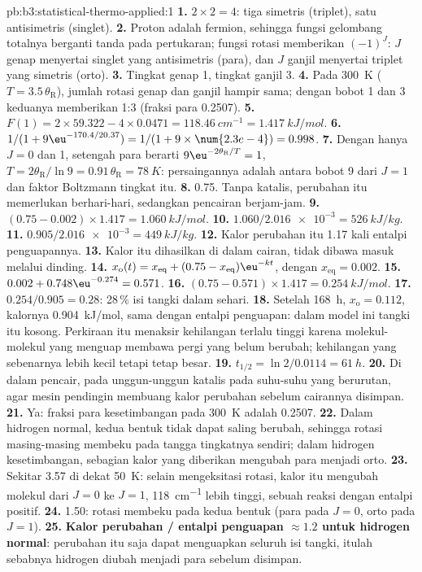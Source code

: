 \begin{solution}{pb:b3:statistical-thermo-applied:1}
\textbf{1.} $2 \times 2 = 4$: tiga simetris (triplet), satu antisimetris (singlet).
\textbf{2.} Proton adalah fermion, sehingga fungsi gelombang totalnya berganti
tanda pada pertukaran; fungsi rotasi memberikan $(-1)^J$: $J$ genap menyertai
singlet yang antisimetris (para), dan $J$ ganjil menyertai triplet yang
simetris (orto).
\textbf{3.} Tingkat genap 1, tingkat ganjil 3.
\textbf{4.} Pada \qty{300}{K} ($T = 3.5\,\theta_{\mathrm R}$), jumlah rotasi genap dan
ganjil hampir sama; dengan bobot 1 dan 3 keduanya memberikan 1:3 (fraksi para
0.2507).
\textbf{5.} $F(1) = 2 \times 59.322 - 4 \times 0.0471 = \qty{118.46}{cm^{-1}} = \qty{1.417}{kJ/mol}$.
\textbf{6.} $1/(1 + 9\eu^{-170.4/20.37}) = 1/(1 + 9 \times \num{2.3e-4}) = 0.998$.
\textbf{7.} Dengan hanya $J = 0$ dan 1, setengah para berarti
$9\eu^{-2\theta_{\mathrm R}/T} = 1$, $T = 2\theta_{\mathrm R}/\ln9 =
0.91\,\theta_{\mathrm R} = \qty{78}{K}$: persaingannya adalah antara bobot 9 dari $J = 1$
dan faktor Boltzmann tingkat itu.
\textbf{8.} 0.75. Tanpa katalis, perubahan itu memerlukan berhari-hari,
sedangkan pencairan berjam-jam.
\textbf{9.} $(0.75 - 0.002) \times 1.417 = \qty{1.060}{kJ/mol}$.
\textbf{10.} $1.060/\num{2.016e-3} = \qty{526}{kJ/kg}$.
\textbf{11.} $0.905/\num{2.016e-3} = \qty{449}{kJ/kg}$.
\textbf{12.} Kalor perubahan itu 1.17 kali entalpi penguapannya.
\textbf{13.} Kalor itu dihasilkan di dalam cairan, tidak dibawa masuk melalui
dinding.
\textbf{14.} $x_{\mathrm o}(t) = x_{\mathrm{eq}} + (0.75 - x_{\mathrm{eq}})\eu^{-kt}$, dengan
$x_{\mathrm{eq}} = 0.002$.
\textbf{15.} $0.002 + 0.748\eu^{-0.274} = 0.571$.
\textbf{16.} $(0.75 - 0.571) \times 1.417 = \qty{0.254}{kJ/mol}$.
\textbf{17.} $0.254/0.905 = 0.28$: 28\,\% isi tangki dalam sehari.
\textbf{18.} Setelah \qty{168}{h}, $x_{\mathrm o} = 0.112$, kalornya \qty{0.904}{kJ/mol},
sama dengan entalpi penguapan: dalam model ini tangki itu kosong. Perkiraan
itu menaksir kehilangan terlalu tinggi karena molekul-molekul yang menguap
membawa pergi  yang belum berubah; kehilangan yang sebenarnya
lebih kecil tetapi tetap besar.
\textbf{19.} $t_{1/2} = \ln2/0.0114 = \qty{61}{h}$.
\textbf{20.} Di dalam pencair, pada unggun-unggun katalis pada suhu-suhu yang
berurutan, agar mesin pendingin membuang kalor perubahan sebelum cairannya
disimpan.
\textbf{21.} Ya: fraksi para kesetimbangan pada \qty{300}{K} adalah 0.2507.
\textbf{22.} Dalam hidrogen normal, kedua bentuk tidak dapat saling berubah,
sehingga rotasi masing-masing membeku pada tangga tingkatnya sendiri; dalam
hidrogen kesetimbangan, sebagian kalor yang diberikan mengubah para menjadi
orto.
\textbf{23.} Sekitar 3.57 di dekat \qty{50}{K}: selain mengeksitasi rotasi,
kalor itu mengubah molekul dari $J = 0$ ke $J = 1$, \qty{118}{cm^{-1}} lebih
tinggi, sebuah reaksi dengan entalpi positif.
\textbf{24.} 1.50: rotasi membeku pada kedua bentuk (para pada $J = 0$, orto
pada $J = 1$).
\textbf{25.} \textbf{Kalor perubahan / entalpi penguapan $\approx 1.2$ untuk
hidrogen normal}: perubahan itu saja dapat menguapkan seluruh isi tangki,
itulah sebabnya hidrogen diubah menjadi para sebelum disimpan.
\end{solution}
